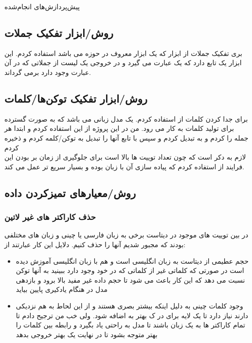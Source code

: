 \Section
{پیش‌پرداز‌ش‌های انجام‌شده}
{
	\subsection{روش/ابزار تفکیک جملات}
	{
		بری تفکیک جملات از ابزار
		که یک ابزار معروف در حوزه
		می باشد استفاده کردم. این ابزار یک تابع 
		دارد که یک عبارت می گیرد و در خروجی یک لیست از جملاتی که در آن عبارت وجود دارد برمی گرداند.
	}
	\subsection{روش/ابزار تفکیک توکن‌ها/کلمات}
	{
		برای جدا کردن کلمات از 
		استفاده کردم.
		یک مدل زبانی 
		می باشد که به صورت گسترده برای تولید
		کلمات به کار می رود. من در این پروژه از این 
		استفاده کردم و ابتدا هر جمله را 
		کردم و به
		تبدیل کردم و  سپس با تابع 
		آنها را تبدیل به توکن/کلمه کردم و ذخیره کردم
		\\ لازم به دکر است که چون تعداد توییت ها بالا است برای جلوگیری از زمان بر بودن این فرایند از 
		استفاده کردم که پیاده سازی آن با زبان 
		بوده و بسیار سریع تر عمل می کند.
	}
	
	\subsection{روش/معیارهای تمیزکردن داده}
	{ 
		\subsubsection{\Large حذف کاراکتر های غیر لاتین}
		{
			در بین توییت های موجود در دیتاست برخی به زبان فارسی یا چینی و زبان های مختلفی بودند که مجبور شدیم آنها را حذف کنیم. دلایل این کار عبارتند از:
			\begin{itemize}
				\item 
				حجم عطیمی از دیتاست به زبان انگلیسی است و
				هم با زبان انگلیسی آموزش دیده است در صورتی که کلماتی غیر از کلماتی که در 
				خود وجود دارد ببینید به آنها توکن
				نسبت می دهد که این کار باعث می شود تا حجم داده غیر مفید بالا برود و بازدهی مدل در هنگام یادکیری پایین بیاید
				\item 
				وجود کلمات چینی به دلیل اینکه بیشتر بصری هستند و از این لحاط به هم نزدیکی دارند نیاز دارد تا یک لایه
				برای در ک بهتر به 
				اضافه شود. ولی خب من ترجیح دادم تا تمام کاراکتر ها به یک زبان باشند تا مدل به راحتی یاد بگیرد و رابطه بین کلمات را بهتر متوجه بشود تا در نهایت یک 
				بهتر خروجی بدهد
			\end{itemize}
			
}}}
